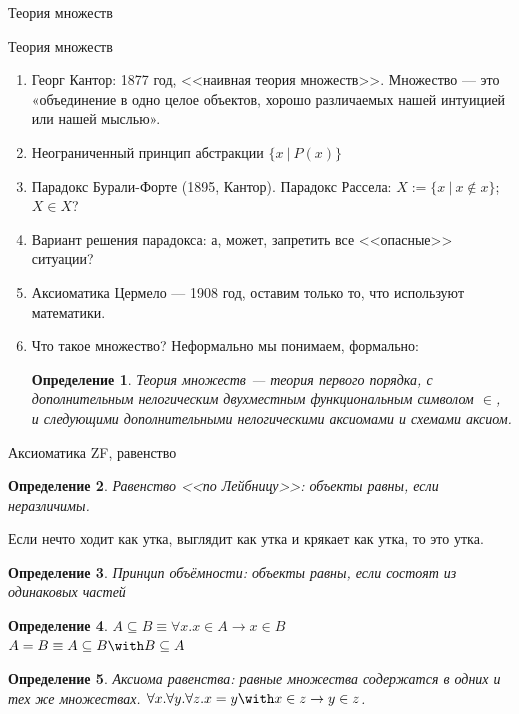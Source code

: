 \documentclass[aspectratio=169]{beamer}
\newtheorem{dfn}{Определение}[section]
\begin{document}
\newcommand\doubleplus{+\kern-1.3ex+\kern0.8ex}
\newcommand\mdoubleplus{\ensuremath{\mathbin{+\mkern-10mu+}}}

\begin{frame}{}
\LARGE\begin{center}Теория множеств\end{center}
\end{frame}

\begin{frame}{Теория множеств}
\begin{enumerate}
\item Георг Кантор: 1877 год, <<наивная теория множеств>>. Множество --- это «объединение в одно
целое объектов, хорошо различаемых нашей интуицией или нашей мыслью».\pause
\item Неограниченный принцип абстракции $\{ x\ |\ P(x)\}$ \pause
\item Парадокс Бурали-Форте (1895, Кантор). Парадокс Рассела: $X := \{ x\ |\ x \notin x\}$; $X\in X$?\pause
\item Вариант решения парадокса: а, может, запретить все <<опасные>> ситуации? \pause
\item Аксиоматика Цермело --- 1908 год, оставим только то, что используют математики. \pause
\item Что такое множество? Неформально мы понимаем, формально:\pause

\begin{dfn} Теория множеств --- теория первого порядка,
с дополнительным нелогическим двухместным функциональным символом $\in$, и следующими 
дополнительными нелогическими аксиомами и схемами аксиом.
\end{dfn}
\end{enumerate}
\end{frame}

\begin{frame}{Аксиоматика ZF, равенство}
\begin{dfn} Равенство <<по Лейбницу>>: объекты равны, если неразличимы.\end{dfn} Если нечто ходит как утка, выглядит как 
утка и крякает как утка, то это утка.\pause
\begin{dfn} Принцип объёмности: объекты равны, если состоят из одинаковых частей\end{dfn}\pause

\begin{dfn} $A \subseteq B \equiv \forall x.x \in A \rightarrow x \in B$ \\\pause
 $A = B \equiv A \subseteq B \with B \subseteq A$ \end{dfn}\pause
\begin{dfn} Аксиома равенства: равные множества содержатся в одних и тех же множествах. 
$\forall x. \forall y. \forall z. x = y \with x \in z \rightarrow y \in z$.
\end{dfn}
\end{frame}
\end{document}
